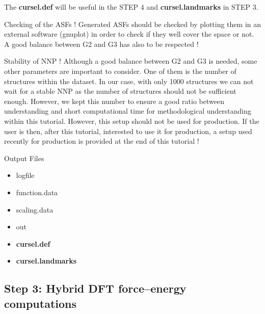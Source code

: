 \documentclass[12pt]{article}
\newcommand\Warning{%
 \makebox[1.4em][c]{%
 \makebox[0pt][c]{\raisebox{.1em}{\small!}}%
 \makebox[0pt][c]{\color{red}\Large$\bigtriangleup$}}}%
\begin{document}
The \textbf{cursel.def} will be useful in the STEP 4 and \textbf{cursel.landmarks} in STEP 3. \\
\begin{mybox1}{Checking of the ASFs !}
\Warning Generated ASFs  should be checked by plotting them in an external software (gnuplot) in order to check if they well cover the space or not. A good balance between G2 and G3 has also to be respected !
\end{mybox1}
\begin{mybox1}{Stability of NNP !}
\Warning Although a good balance between G2 and G3 is needed, some other parameters are important to consider. One of them is the number of structures within the dataset. In our case, with only 1000 structures we can not wait for a stable NNP as the number of structures should not be sufficient enough. However, we kept this number to ensure a good ratio between understanding and short computational time for methodological understanding within this tutorial. However, this setup should not be used for production. If the user is then, after this tutorial, interested to use it for production, a setup used recently for production is provided at the end of this tutorial ! 
\end{mybox1}


\begin{mybox3}{Output Files}
\begin{itemize}
    \item logfile
    \item function.data
    \item scaling.data
    \item out
    \item \textbf{cursel.def}
    \item \textbf{cursel.landmarks}
\end{itemize}
\end{mybox3}
%
\subsection{Step 3: Hybrid DFT force--energy computations}
\end{document}
